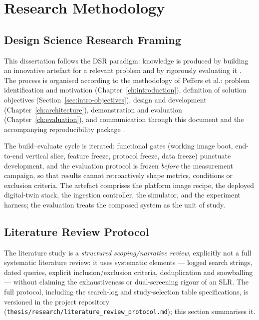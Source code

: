 
\chapter{Research Methodology}
\label{ch:methodology}

\section{Design Science Research Framing}
\label{sec:method-dsr}

\noindent This dissertation follows the \ac{DSR} paradigm: knowledge is
produced by building an innovative artefact for a relevant problem and by
rigorously evaluating it \cite{hevner2004design}. The process is organised
according to the methodology of Peffers et al.: problem identification and
motivation (Chapter~\ref{ch:introduction}), definition of solution
objectives (Section~\ref{sec:intro-objectives}), design and development
(Chapter~\ref{ch:architecture}), demonstration and evaluation
(Chapter~\ref{ch:evaluation}), and communication through this document and
the accompanying reproducibility package \cite{peffers2007design}.

The build--evaluate cycle is iterated: functional gates (working image boot,
end-to-end vertical slice, feature freeze, protocol freeze, data freeze)
punctuate development, and the evaluation protocol is frozen \emph{before} the
measurement campaign, so that results cannot retroactively shape metrics,
conditions or exclusion criteria. The artefact comprises the platform image
recipe, the deployed digital-twin stack, the ingestion controller, the
simulator, and the experiment harness; the evaluation treats the composed
system as the unit of study.

\section{Literature Review Protocol}
\label{sec:method-review}

\noindent The literature study is a \emph{structured scoping/narrative
review}, explicitly not a full systematic literature review: it uses
systematic elements --- logged search strings, dated queries, explicit
inclusion/exclusion criteria, deduplication and snowballing --- without
claiming the exhaustiveness or dual-screening rigour of an SLR. The full
protocol, including the search-log and study-selection table specifications,
is versioned in the project repository
(\texttt{thesis/research/literature\_review\_protocol.md}); this section
summarises it.


